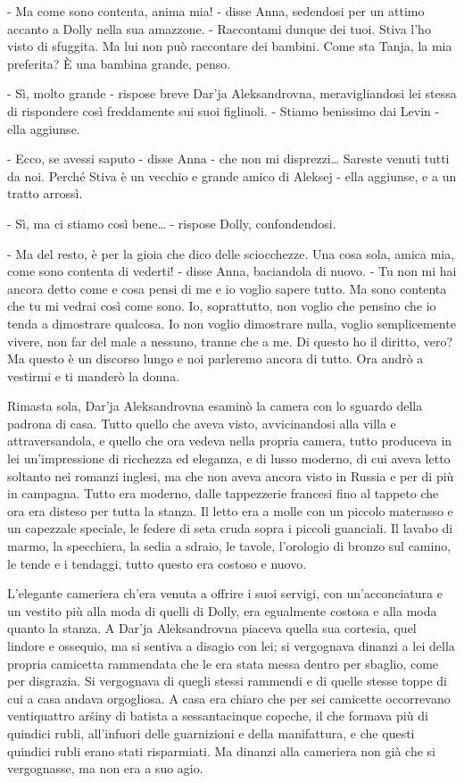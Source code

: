 - Ma come sono contenta, anima mia! - disse Anna, sedendosi per un attimo accanto a Dolly nella sua amazzone. - Raccontami dunque dei tuoi. Stiva l'ho visto di sfuggita. Ma lui non può raccontare dei bambini. Come sta Tanja, la mia preferita? È una bambina grande, penso. 

- Sì, molto grande - rispose breve Dar'ja Aleksandrovna, meravigliandosi lei stessa di rispondere così freddamente sui suoi figliuoli. - Stiamo benissimo dai Levin - ella aggiunse. 

- Ecco, se avessi saputo - disse Anna - che non mi disprezzi\ldots{} Sareste venuti tutti da noi. Perché Stiva è un vecchio e grande amico di Aleksej - ella aggiunse, e a un tratto arrossì. 

- Sì, ma ci stiamo così bene\ldots{} - rispose Dolly, confondendosi. 

- Ma del resto, è per la gioia che dico delle sciocchezze. Una cosa sola, amica mia, come sono contenta di vederti! - disse Anna, baciandola di nuovo. - Tu non mi hai ancora detto come e cosa pensi di me e io voglio sapere tutto. Ma sono contenta che tu mi vedrai così come sono. Io, soprattutto, non voglio che pensino che io tenda a dimostrare qualcosa. Io non voglio dimostrare nulla, voglio semplicemente vivere, non far del male a nessuno, tranne che a me. Di questo ho il diritto, vero? Ma questo è un discorso lungo e noi parleremo ancora di tutto. Ora andrò a vestirmi e ti manderò la donna. 

\label{xix-5} 

Rimasta sola, Dar'ja Aleksandrovna esaminò la camera con lo sguardo della padrona di casa. Tutto quello che aveva visto, avvicinandosi alla villa e attraversandola, e quello che ora vedeva nella propria camera, tutto produceva in lei un'impressione di ricchezza ed eleganza, e di lusso moderno, di cui aveva letto soltanto nei romanzi inglesi, ma che non aveva ancora visto in Russia e per di più in campagna. Tutto era moderno, dalle tappezzerie francesi fino al tappeto che ora era disteso per tutta la stanza. Il letto era a molle con un piccolo materasso e un capezzale speciale, le federe di seta cruda sopra i piccoli guanciali. Il lavabo di marmo, la specchiera, la sedia a sdraio, le tavole, l'orologio di bronzo sul camino, le tende e i tendaggi, tutto questo era costoso e nuovo. 

L'elegante cameriera ch'era venuta a offrire i suoi servigi, con un'acconciatura e un vestito più alla moda di quelli di Dolly, era egualmente costosa e alla moda quanto la stanza. A Dar'ja Aleksandrovna piaceva quella sua cortesia, quel lindore e ossequio, ma si sentiva a disagio con lei; si vergognava dinanzi a lei della propria camicetta rammendata che le era stata messa dentro per sbaglio, come per disgrazia. Si vergognava di quegli stessi rammendi e di quelle stesse toppe di cui a casa andava orgogliosa. A casa era chiaro che per sei camicette occorrevano ventiquattro aršiny di batista a sessantacinque copeche, il che formava più di quindici rubli, all'infuori delle guarnizioni e della manifattura, e che questi quindici rubli erano stati risparmiati. Ma dinanzi alla cameriera non già che si vergognasse, ma non era a suo agio. 

